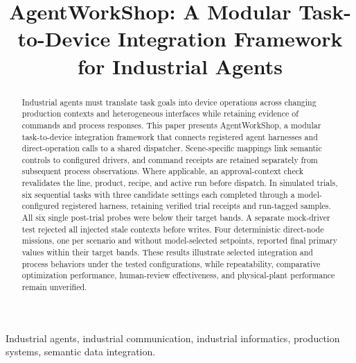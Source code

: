 \documentclass[journal]{IEEEtran}
\begin{document}

\title{AgentWorkShop: A Modular Task-to-Device Integration Framework for Industrial Agents}

\author{}

\maketitle

\begin{abstract}
Industrial agents must translate task goals into device operations across
changing production contexts and heterogeneous interfaces while retaining
evidence of commands and process responses. This paper presents AgentWorkShop,
a modular task-to-device integration framework that connects registered agent
harnesses and direct-operation calls to a shared dispatcher. Scene-specific
mappings link semantic controls to configured drivers, and command receipts
are retained separately from subsequent process observations. Where applicable,
an approval-context check revalidates the line, product, recipe, and active run
before dispatch. In simulated trials, six sequential tasks with three
candidate settings each completed through a model-configured registered
harness, retaining verified trial receipts and run-tagged samples. All six
single post-trial probes were below their target bands. A separate mock-driver
test rejected all injected stale contexts before writes. Four deterministic
direct-node missions, one per scenario and without model-selected setpoints,
reported final primary values within their target bands. These results
illustrate selected integration and process behaviors under the tested
configurations, while repeatability, comparative optimization performance,
human-review effectiveness, and physical-plant performance remain unverified.
\end{abstract}

\begin{IEEEkeywords}
Industrial agents, industrial communication, industrial informatics,
production systems, semantic data integration.
\end{IEEEkeywords}

\IEEEpeerreviewmaketitle








\balance


\end{document}

